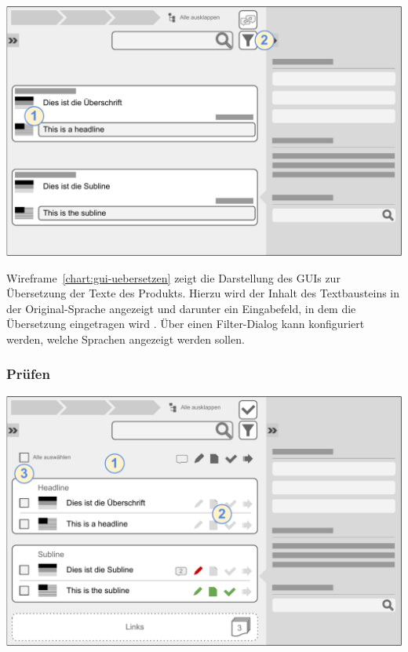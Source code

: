 \begin{center}
\includegraphics[width=\textwidth]{media/GUITexteuebersetzen.pdf}
\label{chart:gui-uebersetzen}
\end{center}

Wireframe~\ref{chart:gui-uebersetzen} zeigt die Darstellung des GUIs zur Übersetzung der Texte des Produkts. Hierzu wird der Inhalt des Textbausteins in der Original-Sprache angezeigt und darunter ein Eingabefeld, in dem die Übersetzung eingetragen wird . Über einen Filter-Dialog  kann konfiguriert werden, welche Sprachen angezeigt werden sollen.

\pagebreak

\subsubsection{Prüfen}\label{l:gui-qs}

\begin{center}
\includegraphics[width=\textwidth]{media/GUIFreigabe.pdf}
\label{chart:gui-qs}
\end{center}

